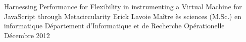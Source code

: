 \documentclass[letterpaper,9pt]{report}
\begin{document}


% 


\titrememoire
    {Harnessing Performance for Flexibility in instrumenting a Virtual Machine
    for JavaScript through Metacircularity}
	{Erick Lavoie}
	{Ma\^itre \`es sciences (M.Sc.) en informatique}
	{D\'epartement d'Informatique et de Recherche Op\'erationelle}
	{D\'ecembre 2012}



%

%
%









%





% 
\end{document}
